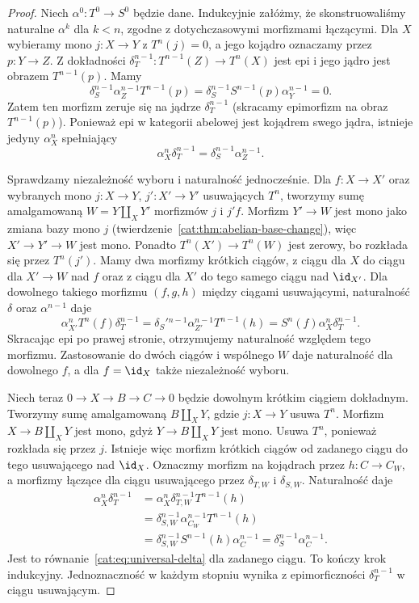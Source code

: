 \begin{proof}
Niech $\alpha^0:T^0\to S^0$ będzie dane. Indukcyjnie załóżmy, że skonstruowaliśmy naturalne $\alpha^k$ dla $k<n$, zgodne z dotychczasowymi morfizmami łączącymi. Dla $X$ wybieramy mono $j:X\to Y$ z $T^n(j)=0$, a jego kojądro oznaczamy przez $p:Y\to Z$. Z dokładności $\delta_T^{n-1}:T^{n-1}(Z)\to T^n(X)$ jest epi i jego jądro jest obrazem $T^{n-1}(p)$. Mamy
\[
 \delta_S^{n-1}\alpha_Z^{n-1}T^{n-1}(p)
 =\delta_S^{n-1}S^{n-1}(p)\alpha_Y^{n-1}=0.
\]
Zatem ten morfizm zeruje się na jądrze $\delta_T^{n-1}$ (skracamy epimorfizm na obraz $T^{n-1}(p)$). Ponieważ epi w kategorii abelowej jest kojądrem swego jądra, istnieje jedyny $\alpha_X^n$ spełniający
\begin{equation}\label{cat:eq:universal-delta}
 \alpha_X^n\delta_T^{n-1}=\delta_S^{n-1}\alpha_Z^{n-1}.
\end{equation}

Sprawdzamy niezależność wyboru i naturalność jednocześnie. Dla $f:X\to X'$ oraz wybranych mono $j:X\to Y$, $j':X'\to Y'$ usuwających $T^n$, tworzymy sumę amalgamowaną $W=Y\amalg_X Y'$ morfizmów $j$ i $j'f$. Morfizm $Y'\to W$ jest mono jako zmiana bazy mono $j$ (twierdzenie~\ref{cat:thm:abelian-base-change}), więc $X'\to Y'\to W$ jest mono. Ponadto $T^n(X')\to T^n(W)$ jest zerowy, bo rozkłada się przez $T^n(j')$. Mamy dwa morfizmy krótkich ciągów, z ciągu dla $X$ do ciągu dla $X'\to W$ nad $f$ oraz z ciągu dla $X'$ do tego samego ciągu nad $\id_{X'}$. Dla dowolnego takiego morfizmu $(f,g,h)$ między ciągami usuwającymi, naturalność $\delta$ oraz $\alpha^{n-1}$ daje
\[
 \alpha_{X'}^n T^n(f)\delta_T^{n-1}
 =\delta_S'{}^{n-1}\alpha_{Z'}^{n-1}T^{n-1}(h)
 =S^n(f)\alpha_X^n\delta_T^{n-1}.
\]
Skracając epi po prawej stronie, otrzymujemy naturalność względem tego morfizmu. Zastosowanie do dwóch ciągów i wspólnego $W$ daje naturalność dla dowolnego $f$, a dla $f=\id_X$ także niezależność wyboru.

Niech teraz $0\to X\to B\to C\to0$ będzie dowolnym krótkim ciągiem dokładnym. Tworzymy sumę amalgamowaną $B\amalg_X Y$, gdzie $j:X\to Y$ usuwa $T^n$. Morfizm $X\to B\amalg_X Y$ jest mono, gdyż $Y\to B\amalg_X Y$ jest mono. Usuwa $T^n$, ponieważ rozkłada się przez $j$. Istnieje więc morfizm krótkich ciągów od zadanego ciągu do tego usuwającego nad $\id_X$. Oznaczmy morfizm na kojądrach przez $h:C\to C_W$, a morfizmy łączące dla ciągu usuwającego przez $\delta_{T,W}$ i $\delta_{S,W}$. Naturalność daje
\[
\begin{aligned}
\alpha_X^n\delta_T^{n-1}
&=\alpha_X^n\delta_{T,W}^{n-1}T^{n-1}(h)\\
&=\delta_{S,W}^{n-1}\alpha_{C_W}^{n-1}T^{n-1}(h)\\
&=\delta_{S,W}^{n-1}S^{n-1}(h)\alpha_C^{n-1}
=\delta_S^{n-1}\alpha_C^{n-1}.
\end{aligned}
\]
Jest to równanie~\eqref{cat:eq:universal-delta} dla zadanego ciągu. To kończy krok indukcyjny. Jednoznaczność w każdym stopniu wynika z epimorficzności $\delta_T^{n-1}$ w ciągu usuwającym.
\end{proof}
